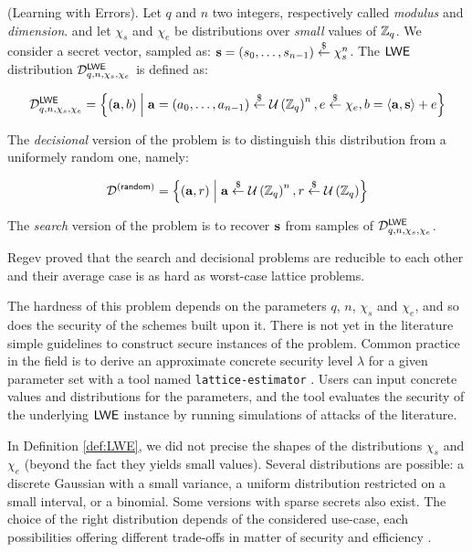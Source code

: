 \begin{definition}
	(Learning with Errors). Let $q$ and $n$ two integers, respectively called \textit{modulus} and \textit{dimension}.  and let $\chi_s$ and $\chi_e$ be distributions over \textit{small} values of $\mathbb{Z}_q$. We consider a secret vector, sampled as: $\mathbf s = (s_0, \dots, s_{n-1}) \overset{\$}{\leftarrow} \chi_s^n$. The $\textsf{LWE}$ distribution $\mathcal{D}_{q, n, \chi_s, \chi_e}^{\textsf{LWE}}$ is defined as:
	
	 \[
	 \mathcal{D}_{q, n, \chi_s, \chi_e}^{\textsf{LWE}} = \left \{(\mathbf a, b) \;\middle|\; \mathbf a = (a_0, \dots, a_{n-1}) \overset{\$}{\leftarrow} \mathcal U \left ( \mathbb{Z}_q \right )^n, e \overset{\$}{\leftarrow} \chi_e, b = \left \langle \mathbf a, \mathbf s \right \rangle + e \right \}
	  \]
	 
	 The \textit{decisional} version of the problem is to distinguish this distribution from a uniformely random one, namely:
	
	\[
	\mathcal{D}^{(\textsf{random})} = \left \{(\mathbf a, r) \;\middle|\; \mathbf a \overset{\$}{\leftarrow} \mathcal U \left ( \mathbb{Z}_q \right )^n, r \overset{\$}{\leftarrow} \mathcal U \left ( \mathbb{Z}_q \right ) \right\}
	\]

	The \emph{search} version of the problem is to recover $\mathbf s$ from samples of $\mathcal{D}_{q, n, \chi_s, \chi_e}^{\textsf{LWE}}$. 
	\label{def:LWE}
\end{definition}


Regev proved that the search and decisional problems are reducible to each other and their average case is as hard as worst-case lattice problems.

The hardness of this problem depends on the parameters $q$, $n$, $\chi_s$ and $\chi_e$, and so does the security of the schemes built upon it. There is not yet in the literature simple guidelines to construct secure instances of the problem. Common practice in the field is to derive an approximate concrete security level $\lambda$ for a given parameter set with a tool named \texttt{lattice-estimator} \cite{lattice-estimator}. Users can input concrete values and distributions for the parameters, and the tool evaluates the security of the underlying $\textsf{LWE}$ instance by running simulations of attacks of the literature.

In Definition \ref{def:LWE}, we did not precise the shapes of the distributions $\chi_s$ and $\chi_e$ (beyond the fact they yields small values). Several distributions are possible: a discrete Gaussian with a small variance, a uniform distribution restricted on a small interval, or a binomial. Some versions with sparse secrets also exist. The choice of the right distribution depends of the considered use-case, each possibilities offering different trade-offs in matter of security and efficiency \cite{AFRICACRYPT:BGPW16, DBLP:conf/ccs/CurtisP19, EPRINT:BGPT19, EPRINT:SLZS24}.


